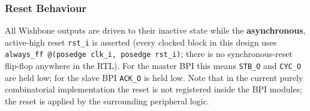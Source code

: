 \subsubsection{Reset Behaviour}
\label{subsubsec:wbResetBehaviour}

All Wishbone outputs are driven to their inactive state while the
\textbf{asynchronous}, active-high reset \texttt{rst\_i} is asserted (every
clocked block in this design uses
\texttt{always\_ff\ @(posedge\ clk\_i,\ posedge\ rst\_i)}; there is no
synchronous-reset flip-flop anywhere in the RTL).
For the master BPI this means \texttt{STB\_O} and \texttt{CYC\_O} are held
low; for the slave BPI \texttt{ACK\_O} is held low.
Note that in the current purely combinatorial implementation the reset
is not registered inside the BPI modules; the reset is applied by the
surrounding peripheral logic.

